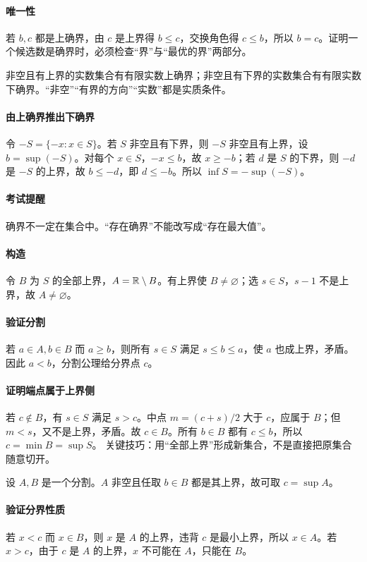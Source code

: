 \paragraph{唯一性}若 $b,c$ 都是上确界，由 $c$ 是上界得 $b\le c$，交换角色得 $c\le b$，所以 $b=c$。证明一个候选数是确界时，必须检查“界”与“最优的界”两部分。

非空且有上界的实数集合有有限实数上确界；非空且有下界的实数集合有有限实数下确界。“非空”“有界的方向”“实数”都是实质条件。
\paragraph{由上确界推出下确界}令 $-S=\{-x:x\in S\}$。若 $S$ 非空且有下界，则 $-S$ 非空且有上界，设 $b=\sup(-S)$。对每个 $x\in S$，$-x\le b$，故 $x\ge-b$；若 $d$ 是 $S$ 的下界，则 $-d$ 是 $-S$ 的上界，故 $b\le-d$，即 $d\le-b$。所以 $\inf S=-\sup(-S)$。
\paragraph{考试提醒}确界不一定在集合中。“存在确界”不能改写成“存在最大值”。

\paragraph{构造}令 $B$ 为 $S$ 的全部上界，$A=\mathbb{R}\setminus B$。有上界使 $B\ne\varnothing$；选 $s\in S$，$s-1$ 不是上界，故 $A\ne\varnothing$。
\paragraph{验证分割}若 $a\in A,b\in B$ 而 $a\ge b$，则所有 $s\in S$ 满足 $s\le b\le a$，使 $a$ 也成上界，矛盾。因此 $a<b$，分割公理给分界点 $c$。
\paragraph{证明端点属于上界侧}若 $c\notin B$，有 $s\in S$ 满足 $s>c$。中点 $m=(c+s)/2$ 大于 $c$，应属于 $B$；但 $m<s$，又不是上界，矛盾。故 $c\in B$。所有 $b\in B$ 都有 $c\le b$，所以 $c=\min B=\sup S$。
关键技巧：用“全部上界”形成新集合，不是直接把原集合随意切开。

设 $A,B$ 是一个分割。$A$ 非空且任取 $b\in B$ 都是其上界，故可取 $c=\sup A$。
\paragraph{验证分界性质}若 $x<c$ 而 $x\in B$，则 $x$ 是 $A$ 的上界，违背 $c$ 是最小上界，所以 $x\in A$。若 $x>c$，由于 $c$ 是 $A$ 的上界，$x$ 不可能在 $A$，只能在 $B$。
